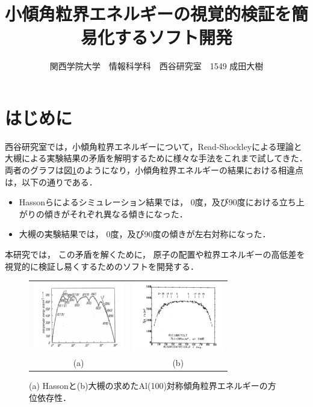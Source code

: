 \documentclass[a4j,twocolumn]{jsarticle}
\begin{document}
\title{小傾角粒界エネルギーの視覚的検証を簡易化するソフト開発}
\author{関西学院大学　情報科学科　西谷研究室　1549 成田大樹}
\date{}
\maketitle

\section{はじめに}
西谷研究室では，小傾角粒界エネルギーについて，Read-Shockleyによる理論と大槻による実験結果の矛盾を解明するために様々な手法をこれまで試してきた．
両者のグラフは図\ref{fig:one}のようになり，小傾角粒界エネルギーの結果における相違点は，以下の通りである．
\begin{itemize}
\item Hassonらによるシミュレーション結果では，
0度，及び90度における立ち上がりの傾きがそれぞれ異なる傾きになった．

\item 大槻の実験結果では，
0度，及び90度の傾きが左右対称になった．
\end{itemize}

本研究では，
この矛盾を解くために，
原子の配置や粒界エネルギーの高低差を視覚的に検証し易くするためのソフトを開発する．

\begin{figure}[h]
\begin{center}
\begin{tabular}{cc}
   \includegraphics[width=40mm]{./Hasson.png} &
   \includegraphics[width=40mm]{./Otsuki.png} \\
   (a) & (b)
\end{tabular}
  \caption{(a) Hassonと(b)大槻の求めたAl(100)対称傾角粒界エネルギーの方位依存性．}
  \label{fig:one}
\end{center}
\end{figure}
\end{document}
